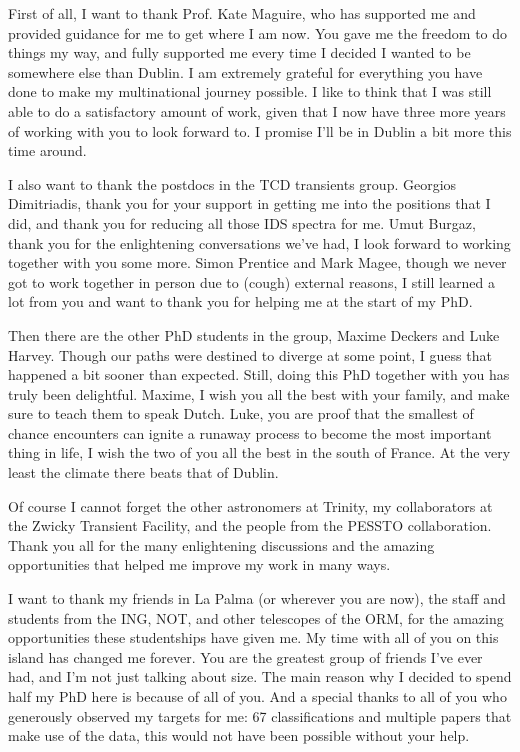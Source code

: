 
\begin{acknowledgements}
First of all, I want to thank Prof. Kate Maguire, who has supported me and provided guidance for me to get where I am now. You gave me the freedom to do things my way, and fully supported me every time I decided I wanted to be somewhere else than Dublin. I am extremely grateful for everything you have done to make my multinational journey possible. I like to think that I was still able to do a satisfactory amount of work, given that I now have three more years of working with you to look forward to. I promise I'll be in Dublin a bit more this time around.

I also want to thank the postdocs in the TCD transients group. Georgios Dimitriadis, thank you for your support in getting me into the positions that I did, and thank you for reducing all those IDS spectra for me. Umut Burgaz, thank you for the enlightening conversations we've had, I look forward to working together with you some more. Simon Prentice and Mark Magee, though we never got to work together in person due to (cough) external reasons, I still learned a lot from you and want to thank you for helping me at the start of my PhD.

Then there are the other PhD students in the group, Maxime Deckers and Luke Harvey. Though our paths were destined to diverge at some point, I guess that happened a bit sooner than expected. Still, doing this PhD together with you has truly been delightful. Maxime, I wish you all the best with your family, and make sure to teach them to speak Dutch. Luke, you are proof that the smallest of chance encounters can ignite a runaway process to become the most important thing in life, I wish the two of you all the best in the south of France. At the very least the climate there beats that of Dublin.

Of course I cannot forget the other astronomers at Trinity, my collaborators at the Zwicky Transient Facility, and the people from the PESSTO collaboration. Thank you all for the many enlightening discussions and the amazing opportunities that helped me improve my work in many ways.

I want to thank my friends in La Palma (or wherever you are now), the staff and students from the ING, NOT, and other telescopes of the ORM, for the amazing opportunities these studentships have given me. My time with all of you on this island has changed me forever. You are the greatest group of friends I've ever had, and I'm not just talking about size. The main reason why I decided to spend half my PhD here is because of all of you. And a special thanks to all of you who generously observed my targets for me: 67 classifications and multiple papers that make use of the data, this would not have been possible without your help. %


\end{acknowledgements}
